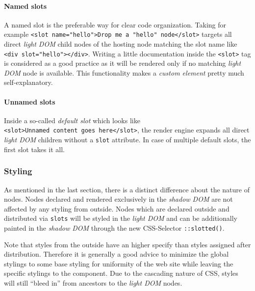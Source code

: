 \documentclass[]{assets/latex/ieee}
\let\oldparagraph\paragraph
\renewcommand{\paragraph}[1]{\oldparagraph{#1}\mbox{}}
\begin{document}
\paragraph{Named slots}\label{named-slots}

A named slot is the preferable way for clear code organization. Taking
for example
\texttt{\textless{}slot\ name="hello"\textgreater{}Drop\ me\ a\ "hello"\ node\textless{}/slot\textgreater{}}
targets all direct \emph{light DOM} child nodes of the hosting node
matching the slot name like
\texttt{\textless{}div\ slot="hello"\textgreater{}\textless{}/div\textgreater{}}.
Writing a little documentation inside the
\texttt{\textless{}slot\textgreater{}} tag is considered as a good
practice as it will be rendered only if no matching \emph{light DOM}
node is available. This functionality makes a \emph{custom element}
pretty much self-explanatory.

\paragraph{Unnamed slots}\label{unnamed-slots}

Inside a so-called \emph{default slot} which looks like
\texttt{\textless{}slot\textgreater{}Unnamed\ content\ goes\ here\textless{}/slot\textgreater{}},
the render engine expands all direct \emph{light DOM} children without a
\texttt{slot} attribute. In case of multiple default slots, the first
slot takes it all.

\subsubsection{Styling}\label{styling}

As mentioned in the last section, there is a distinct difference about
the nature of nodes. Nodes declared and rendered exclusively in the
\emph{shadow DOM} are not affected by any styling from outside. Nodes
which are declared outside and distributed via \texttt{slots} will be
styled in the \emph{light DOM} and can be additionally painted in the
\emph{shadow DOM} through the new CSS-Selector \texttt{::slotted()}.

Note that styles from the outside have an higher specify than styles
assigned after distribution. Therefore it is generally a good advice to
minimize the global stylings to some base styling for uniformity of the
web site while leaving the specific stylings to the component. Due to
the cascading nature of CSS, styles will still ``bleed in'' from
ancestors to the \emph{light DOM} nodes.
\end{document}

